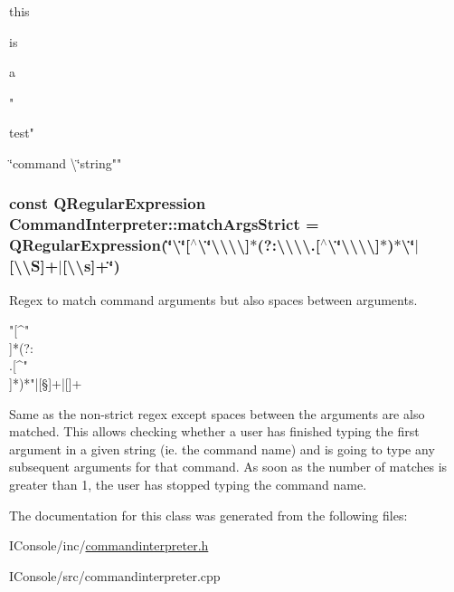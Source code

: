 \begin{DoxyItemize}
\item this 
\item is 
\item a 
\item " 
\item test" 
\item \char`\"{}command \textbackslash{}\char`\"{}string""
\end{DoxyItemize}\hypertarget{class_command_interpreter_afd08ad40b67d0d24dff5c6d992e55bad}{
\subsubsection[{match\-Args\-Strict}]{\setlength{\rightskip}{0pt plus 5cm}const Q\-Regular\-Expression Command\-Interpreter\-::match\-Args\-Strict = Q\-Regular\-Expression(\char`\"{}\textbackslash{}\char`\"{}\mbox{[}$^\wedge$\textbackslash{}\char`\"{}\textbackslash{}\textbackslash{}\textbackslash{}\textbackslash{}\mbox{]}$\ast$(?\-:\textbackslash{}\textbackslash{}\textbackslash{}\textbackslash{}.\mbox{[}$^\wedge$\textbackslash{}\char`\"{}\textbackslash{}\textbackslash{}\textbackslash{}\textbackslash{}\mbox{]}$\ast$)$\ast$\textbackslash{}\char`\"{}$|$\mbox{[}\textbackslash{}\textbackslash{}S\mbox{]}+$|$\mbox{[}\textbackslash{}\textbackslash{}s\mbox{]}+\char`\"{})\hspace{0.3cm}{\ttfamily [static]}}}\label{class_command_interpreter_afd08ad40b67d0d24dff5c6d992e55bad}


Regex to match command arguments but also spaces between arguments.\par
 {\bfseries  }

\begin{DoxyVerb}"[^"\\]*(?:\\.[^"\\]*)*"|[\S]+|[\s]+ \end{DoxyVerb}
\par
 Same as the non-\/strict regex except spaces between the arguments are also matched. This allows checking whether a user has finished typing the first argument in a given string (ie. the command name) and is going to type any subsequent arguments for that command. As soon as the number of matches is greater than 1, the user has stopped typing the command name. 

The documentation for this class was generated from the following files\-:\begin{DoxyCompactItemize}
\item 
I\-Console/inc/\hyperlink{commandinterpreter_8h}{commandinterpreter.\-h}\item 
I\-Console/src/commandinterpreter.\-cpp\end{DoxyCompactItemize}

